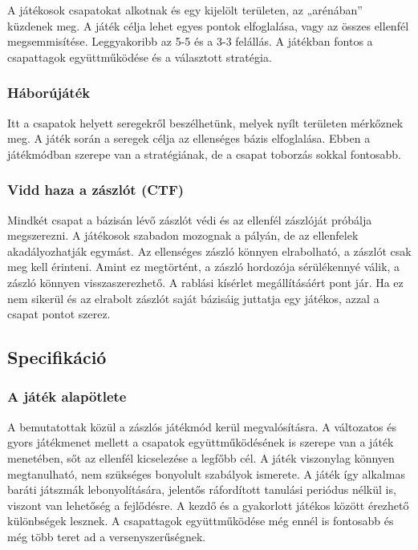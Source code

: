 \documentclass[]{article}
\begin{document}
A játékosok csapatokat alkotnak és egy kijelölt területen, az
„arénában'' küzdenek meg. A játék célja lehet egyes pontok elfoglalása,
vagy az összes ellenfél megsemmisítése. Leggyakoribb az 5-5 és a 3-3
felállás. A játékban fontos a csapattagok együttműködése és a választott
stratégia.

\hypertarget{huxe1boruxfajuxe1tuxe9k}{%
\subsubsection{Háborújáték}\label{huxe1boruxfajuxe1tuxe9k}}

Itt a csapatok helyett seregekről beszélhetünk, melyek nyílt területen
mérkőznek meg. A játék során a seregek célja az ellenséges bázis
elfoglalása. Ebben a játékmódban szerepe van a stratégiának, de a csapat
toborzás sokkal fontosabb.

\hypertarget{vidd-haza-a-zuxe1szluxf3t-ctf}{%
\subsubsection{Vidd haza a zászlót
(CTF)}\label{vidd-haza-a-zuxe1szluxf3t-ctf}}

Mindkét csapat a bázisán lévő zászlót védi és az ellenfél zászlóját
próbálja megszerezni. A játékosok szabadon mozognak a pályán, de az
ellenfelek akadályozhatják egymást. Az ellenséges zászló könnyen
elrabolható, a zászlót csak meg kell érinteni. Amint ez megtörtént, a
zászló hordozója sérülékennyé válik, a zászló könnyen visszaszerezhető.
A rablási kísérlet megállításáért pont jár. Ha ez nem sikerül és az
elrabolt zászlót saját bázisáig juttatja egy játékos, azzal a csapat
pontot szerez.

\hypertarget{specifikuxe1ciuxf3}{%
\subsection{Specifikáció}\label{specifikuxe1ciuxf3}}

\hypertarget{a-juxe1tuxe9k-alapuxf6tlete}{%
\subsubsection{A játék alapötlete}\label{a-juxe1tuxe9k-alapuxf6tlete}}

A bemutatottak közül a zászlós játékmód kerül megvalósításra. A
változatos és gyors játékmenet mellett a csapatok együttműködésének is
szerepe van a játék menetében, sőt az ellenfél kicselezése a legfőbb
cél. A játék viszonylag könnyen megtanulható, nem szükséges bonyolult
szabályok ismerete. A játék így alkalmas baráti játszmák
lebonyolítására, jelentős ráfordított tanulási periódus nélkül is,
viszont van lehetőség a fejlődésre. A kezdő és a gyakorlott játékos
között érezhető különbségek lesznek. A csapattagok együttműködése még
ennél is fontosabb és még több teret ad a versenyszerűségnek.
\end{document}
